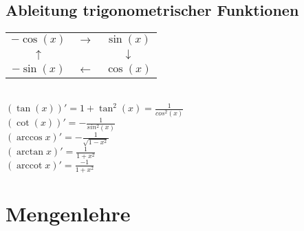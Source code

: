 \documentclass[german]{latex4ei/latex4ei_sheet}
\DeclareMathOperator{\arccot}{arccot}
\begin{document}
\begin{sectionbox}
\subsection{Ableitung trigonometrischer Funktionen}
\begin{tabular}{ccc}
	$-\cos (x)$ & $ \rightarrow$ & $\sin (x)$\\
	$\uparrow $ & 			   & $\downarrow$\\
	$-\sin (x)$	& $\leftarrow$ & $\cos (x)$\\
\end{tabular}\\
$(\tan(x))'=1+\tan^2(x) = \frac{1}{cos^2(x)}$\\
$(\cot(x))'=-\frac{1}{sin^2(x)}$\\
$(\arccos x)' = -\frac{1}{\sqrt{1-x^2}}$\\
$(\arctan x)' = \frac{1}{1+x^2}$\\
$(\arccot x)'= \frac{-1}{1+x^2}$\\


\end{sectionbox}

\columnbreak

\section{Mengenlehre}
\end{document}
